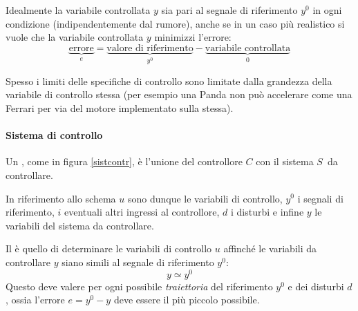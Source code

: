 	Idealmente la variabile controllata $y$ sia pari al segnale di riferimento $y^0$ in ogni condizione (indipendentemente dal rumore), anche se in un caso più realistico si vuole che la variabile controllata $y$ minimizzi l'errore:
	\[ \underbrace{\textrm{errore}}_e = \underbrace{\textrm{valore di riferimento}}_{y^0} - \underbrace{\textrm{variabile controllata}}_0 \]
	
	Spesso i limiti delle specifiche di controllo sono limitate dalla grandezza della variabile di controllo stessa (per esempio una Panda non può accelerare come una Ferrari per via del motore implementato sulla stessa).
	
	\paragraph{Sistema di controllo} Un , come in figura \ref{sistcontr}, è l'unione del controllore $C$ con il sistema $S$\ da controllare. 
	
	In riferimento allo schema $u$ sono dunque le variabili di controllo, $y^0$ i segnali di riferimento, $i$ eventuali altri ingressi al controllore, $d$ i disturbi e infine $y$ le variabili del sistema da controllare.
	\begin{concetto}
		Il  è quello di determinare le variabili di controllo $u$ affinché le variabili da controllare $y$ siano simili al segnale di riferimento $y^0$:
		\[ y\simeq y^0 \]
		Questo deve valere per ogni possibile \textit{traiettoria} del riferimento $y^0$ e dei disturbi $d$, ossia l'errore $e=y^0-y$ deve essere il più piccolo possibile.
	\end{concetto}
	
	
